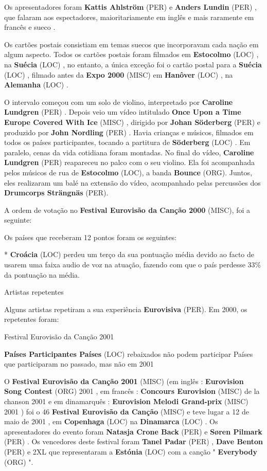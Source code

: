 \documentclass[12pt,a4paper]{article}
\begin{document}
Os apresentadores foram \textbf{Kattis Ahlström} (PER) e \textbf{Anders Lundin} (PER) , que falaram aos espectadores, maioritariamente em inglês e mais raramente em francês e sueco .

Os cartões postais consistiam em temas suecos que incorporavam cada nação em algum aspecto. Todos os cartões postais foram filmados em \textbf{Estocolmo} (LOC) , na \textbf{Suécia} (LOC) , no entanto, a única exceção foi o cartão postal para a \textbf{Suécia} (LOC) , filmado antes da \textbf{Expo 2000} (MISC) em \textbf{Hanôver} (LOC) , na \textbf{Alemanha} (LOC) .

O intervalo começou com um solo de violino, interpretado por \textbf{Caroline Lundgren} (PER) . Depois veio um vídeo intitulado \textbf{Once Upon a Time Europe Covered With Ice} (MISC) , dirigido por \textbf{Johan Söderberg} (PER) e produzido por \textbf{John Nordling} (PER) . Havia crianças e músicos, filmados em todos os países participantes, tocando a partitura de \textbf{Söderberg} (LOC) . Em paralelo, cenas da vida cotidiana foram montadas. No final do vídeo, \textbf{Caroline Lundgren} (PER) reapareceu no palco com o seu violino. Ela foi acompanhada pelos músicos de rua de \textbf{Estocolmo} (LOC), a banda \textbf{Bounce} (ORG). Juntos, eles realizaram um balé na extensão do vídeo, acompanhado pelas percussões dos \textbf{Drumcorps Strängnäs} (PER).

A ordem de votação no \textbf{Festival Eurovisão da Canção 2000} (MISC), foi a seguinte:

Os países que receberam 12 pontos foram os seguintes:

* \textbf{Croácia} (LOC) perdeu um terço da sua pontuação média devido ao facto de usarem uma faixa audio de voz na atuação, fazendo com que o país perdesse 33\% da pontuação na média.



Artistas repetentes

Alguns artistas repetiram a sua experiência \textbf{Eurovisiva} (PER). Em 2000, os repetentes foram:



Festival Eurovisão da Canção 2001



\textbf{Países Participantes Países} (LOC) rebaixados não podem participar Países que participaram no passado, mas não em 2001

O \textbf{Festival Eurovisão da Canção 2001} (MISC) (em inglês : \textbf{Eurovision Song Contest} (ORG) 2001 , em francês : \textbf{Concours Eurovision} (MISC) de la chanson 2001 e em dinamarquês : \textbf{Eurovision Melodi Grand-prix} (MISC) 2001 ) foi o 46 \textbf{Festival Eurovisão da Canção} (MISC) e teve lugar a 12 de maio de 2001 , em \textbf{Copenhaga} (LOC) na \textbf{Dinamarca} (LOC) . Os apresentadores do evento foram \textbf{Natasja Crone Back} (PER) e \textbf{Søren Pilmark} (PER) . Os vencedores deste festival foram \textbf{Tanel Padar} (PER) , \textbf{Dave Benton} (PER) e 2XL que representaram a \textbf{Estónia} (LOC) com a canção " \textbf{Everybody} (ORG) ".
\end{document}

